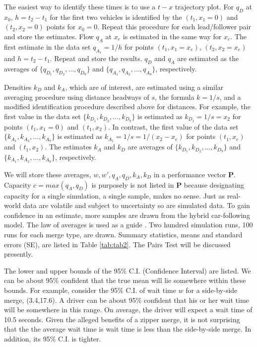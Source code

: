 \documentclass[Proceedings]{ascelike}
\begin{document}
The easiest way to identify these times is to use a $t-x$ trajectory plot. For $q_D$ at $x_0$, $h = t_2 - t_1$ for the first two vehicles is  identified by the $(t_1, x_1 = 0)$ and $(t_2, x_2 = 0)$ points for  $x_0 = 0$.    Repeat this procedure for each lead/follower pair and store the estimates. Flow $q_A$ at $x_e$ is estimated in the same way for $x_e$. The first estimate in the data set   $q_{A _1 } = 1/h $ for points $(t_1, x_1 = x_e)$, $(t_2, x_2 = x_e)$ and $h = t_2 - t_1$. Repeat and store the results. $q_D$ and $q_A$ are estimated as the averages of  $\{q_{D_1},q_{D_2},\ldots,q_{D_9}\}$ and $\{q_{A_1},q_{A_2},\ldots,q_{A_9}\}$, respectively.
 
Densities $k_D$ and $k_A$, which are of interest, are estimated using a similar averaging procedure using distance headways of $s$, the formula $k = 1/s$, and a modified identification procedure described above for distances. For example,  the first value in the data set $\{k_{D_1},k_{D_2},\ldots,k_{D_9}\}$   is estimated as $k_{D_1} = 1/s = x_2$ for points $(t_1, x_1 = 0)$ and $(t_1,  x_2)$. In contrast, the first value of the data set  $\{k_{A_1},k_{A_2},\ldots,k_{A_9}\}$ is estimated as $k_{A_1} = 1/s = 1/( x_2 - x_e)$ for points $(t_1,  x_e)$ and $(t_1,  x_2)$. The estimates $k_A$ and $k_D$ are averages of $\{k_{D_1},k_{D_2},\ldots,k_{D_9}\}$ and $\{k_{A_1},k_{A_2},\ldots,k_{A_9}\}$, respectively.

We will store these averages, $w, w', q_A, q_D, k_A, k_D$  in a performance vector $\mathbf{P}$. Capacity $c = max(q_A,q_D)$ is purposely is not listed in $\mathbf{P}$ because designating capacity for a single simulation, a single sample, makes no sense.  Just as real-world data are volatile and subject to uncertainty so are simulated data. To gain confidence in an estimate, more samples are drawn from the hybrid car-following model. The law of averages is used as a guide  \cite{freedman}. Two hundred  simulation runs, 100 runs for each merge type, are drawn. Summary statistics, means and standard errors (SE), are  listed in Table \ref{tab:tab2}. The Pairs Test will be discussed presently. 

The lower and upper bounds of the 95$\%$ C.I. (Confidence Interval) are listed. We can be about 95$\%$ confident that the true mean will lie somewhere within these bounds. For example, consider the 95$\%$ C.I.  of wait time $w$ for a side-by-side merge, (3.4,17.6). A driver can be about 95$\%$ confident that his or her wait time will be somewhere in this range. On average, the driver will expect a wait time of 10.5 seconds. Given the alleged benefits of a zipper merge, it is not surprising that the the average wait time is wait time is less than the side-by-side merge. In addition, its  95$\%$ C.I.  is tighter.
\end{document}
